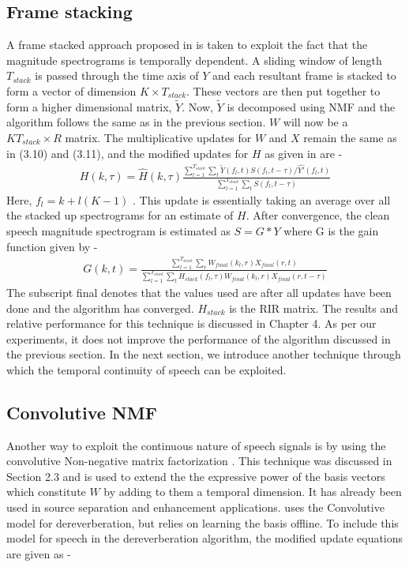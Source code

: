\documentclass[12pt, a4paper, oneside]{book}
\begin{document}
\subsection{Frame stacking} 
A frame stacked approach proposed in \cite{moham} is taken to exploit the fact that the magnitude spectrograms is temporally dependent. A sliding window of length $T_{stack}$ is passed through the time axis of $Y$ and each resultant frame is stacked to form a vector of dimension $K \times T_{stack}$. These vectors are then put together to form a higher dimensional matrix, $\tilde{Y}$. Now, $\tilde{Y}$ is decomposed using NMF and the algorithm follows the same as in the previous section. $W$ will now be a $KT_{stack} \times R$ matrix. The multiplicative updates for $W$ and $X$ remain the same as in (3.10) and (3.11), and the modified updates for $H$ as given in \cite{moham} are -
\begin{align}H(k,\tau) = \hat{H}(k, \tau)\frac{\sum_{l=1}^{T_{stack}}\sum_{t}\tilde{Y}(f_l,t)S(f_l,t -\tau)/\hat{Y'}(f_l,t)}{\sum_{l=1}^{T_{stack}}\sum_{t}S(f_l,t - \tau)}
\end{align}
Here, $f_l = k + l(K-1)$ . This update is essentially taking an average over all the stacked up spectrograms for an estimate of $H$. After convergence, the clean speech magnitude spectrogram is estimated as $S=G*Y$ where G is the gain function given by -
\begin{align}
G(k,t) = \frac{\sum_{l=1}^{T_{stack}}\sum_{r}W_{final}(k_l,r)X_{final}(r,t)}{\sum_{l=1}^{T_{stack}}\sum_{t}H_{stack}(f_l,\tau)W_{final}(k_l,r)X_{final}(r,t- \tau)}
\end{align}
The subscript final denotes that the values used are after all updates have been done and the algorithm has converged. $H_{stack}$ is the RIR matrix. The results and relative performance for this technique is discussed in Chapter 4. As per our experiments, it does not improve the performance of the algorithm discussed in the previous section. In the next section, we introduce another technique through which the temporal continuity of speech can be exploited.

\subsection{Convolutive NMF}
Another way to exploit the continuous nature of speech signals is by using the convolutive Non-negative matrix factorization . This technique was discussed in Section 2.3 and is used to extend the the expressive power of the basis vectors which constitute $W$ by adding to them a temporal dimension. It has already been used in source separation and enhancement applications. \cite{baby} uses the Convolutive model for dereverberation, but relies on learning the basis offline.
To include this model for speech in the dereverberation algorithm, the modified update equations are given as - 
\end{document}
